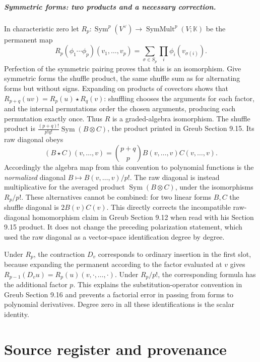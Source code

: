 \documentclass[11pt,a4paper]{book}
\theoremstyle{definition}\newtheorem{definition}[theorem]{Definition}
\theoremstyle{remark}\newtheorem{remark}[theorem]{Remark}
\newcommand{\K}{\mathbb K}\newcommand{\R}{\mathbb R}\newcommand{\C}{\mathbb C}
\DeclareMathOperator{\Sym}{Sym}\DeclareMathOperator{\Ann}{Ann}
\begin{document}
\paragraph{Symmetric forms: two products and a necessary correction.}
In characteristic zero let $R_p:\Sym^p(V^\vee)\to\operatorname{SymMult}^p(V;\K)$ be the permanent map
\[
 R_p(\phi_1\cdots\phi_p)(v_1,\ldots,v_p)
 =\sum_{\sigma\in S_p}\prod_i\phi_i(v_{\sigma(i)}).
\]
Perfection of the symmetric pairing proves that this is an isomorphism. Give symmetric forms the shuffle product, the same shuffle sum as for alternating forms but without signs. Expanding on products of covectors shows that $R_{p+q}(uv)=R_p(u)\mathbin{\star}R_q(v)$: shuffling chooses the arguments for each factor, and the internal permutations order the chosen arguments, producing each permutation exactly once. Thus $R$ is a graded-algebra isomorphism. The shuffle product is $\frac{(p+q)!}{p!q!}\operatorname{Sym}(B\otimes C)$, the product printed in Greub Section 9.15. Its raw diagonal obeys
\[
 (B\mathbin{\star}C)(v,\ldots,v)=\binom{p+q}{p}B(v,\ldots,v)C(v,\ldots,v).
\]
Accordingly the algebra map from this convention to polynomial functions is the \emph{normalized} diagonal $B\mapsto B(v,\ldots,v)/p!$. The raw diagonal is instead multiplicative for the averaged product $\operatorname{Sym}(B\otimes C)$, under the isomorphisms $R_p/p!$. These alternatives cannot be combined: for two linear forms $B,C$ the shuffle diagonal is $2B(v)C(v)$. This directly corrects the incompatible raw-diagonal homomorphism claim in Greub Section 9.12 when read with his Section 9.15 product. It does not change the preceding polarization statement, which used the raw diagonal as a vector-space identification degree by degree.

Under $R_p$, the contraction $D_v$ corresponds to ordinary insertion in the first slot, because expanding the permanent according to the factor evaluated at $v$ gives $R_{p-1}(D_v u)=R_p(u)(v,\cdot,\ldots,\cdot)$. Under $R_p/p!$, the corresponding formula has the additional factor $p$. This explains the substitution-operator convention in Greub Section 9.16 and prevents a factorial error in passing from forms to polynomial derivatives. Degree zero in all these identifications is the scalar identity.


\backmatter

\chapter{Source register and provenance}
\end{document}
